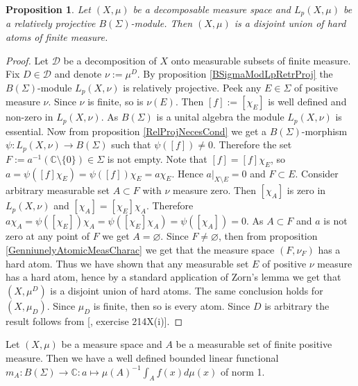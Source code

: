 \documentclass[12pt]{article}
\newtheorem{proposition}[theorem]{Proposition}
\begin{document}
\begin{proposition}\label{LpBSigmaModNecessCond} Let $(X,\mu)$ be a decomposable measure space and $L_p(X,\mu)$ be a relatively projective $B(\Sigma)$-module. Then $(X,\mu)$ is a disjoint union of hard atoms of finite measure.
\end{proposition}
\begin{proof} Let $\mathcal{D}$ be a decomposition of $X$ onto measurable subsets of finite measure. Fix $D\in\mathcal{D}$ and denote $\nu:=\mu^D$. By proposition \ref{BSigmaModLpRetrProj} the $B(\Sigma)$-module $L_p(X,\nu)$ is relatively projective. Peek any $E\in\Sigma$ of positive measure $\nu$. Since $\nu$ is finite, so is $\nu(E)$. Then $[f]:=[\chi_E]$ is well defined and non-zero in $L_p(X,\nu)$. As $B(\Sigma)$ is a unital algebra the module $L_p(X,\nu)$ is essential. Now from proposition \ref{RelProjNecesCond} we get a $B(\Sigma)$-morphism $\psi:L_p(X,\nu)\to B(\Sigma)$ such that $\psi([f])\neq 0$. Therefore the set $F:=a^{-1}(\mathbb{C}\setminus\{0\})\in\Sigma$ is not empty. Note that $[f]=[f]\chi_E$, so $a=\psi([f]\chi_E)=\psi([f])\chi_E=a\chi_E$. Hence $a|_{X\setminus E}=0$ and $F\subset E$. Consider arbitrary measurable set $A\subset F$ with $\nu$ measure zero. Then $[\chi_A]$ is zero in $L_p(X,\nu)$ and $[\chi_A]=[\chi_E]\chi_A$. Therefore $a\chi_A=\psi([\chi_E])\chi_A=\psi([\chi_E]\chi_A)=\psi([\chi_A])=0$. As $A\subset F$ and $a$ is not zero at any point of $F$ we get $A=\varnothing$. Since $F\neq \varnothing$, then from proposition \ref{GenniunelyAtomicMeasCharac} we get that the measure space $(F,\nu_F)$ has a hard atom. Thus we have shown that any measurable set $E$ of positive $\nu$ measure has a hard atom, hence by a standard application of Zorn's lemma we get that $(X,\mu^D)$ is a disjoint union of hard atoms. The same conclusion holds for $(X,\mu_D)$. Since $\mu_D$ is finite, then so is every atom. Since $D$ is arbitrary the result follows from [\cite{FremMeasTh2}, exercise 214X(i)].
\end{proof}

Let $(X,\mu)$ be a measure space and $A$ be a measurable set of finite positive measure. Then we have a well defined bounded linear functional $m_A:B(\Sigma)\to\mathbb{C}:a\mapsto \mu(A)^{-1}\int_A f(x)d\mu(x)$ of norm 1.
\end{document}

